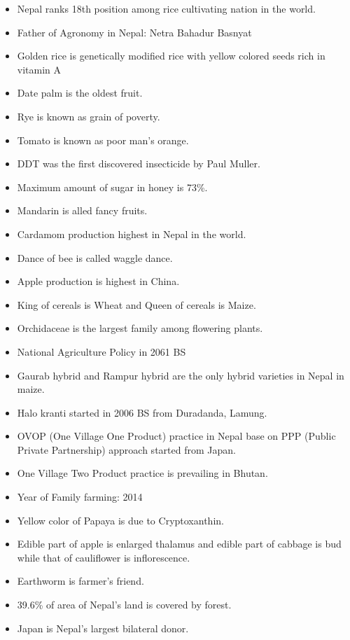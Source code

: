 \documentclass[
  openany]{book}
\providecommand{\tightlist}{%
  \setlength{\itemsep}{0pt}\setlength{\parskip}{0pt}}
\begin{document}
\begin{itemize}
\tightlist
\item
  Nepal ranks 18th position among rice cultivating nation in the world.
\item
  Father of Agronomy in Nepal: Netra Bahadur Basnyat
\item
  Golden rice is genetically modified rice with yellow colored seeds rich in vitamin A
\item
  Date palm is the oldest fruit.
\item
  Rye is known as grain of poverty.
\item
  Tomato is known as poor man's orange.
\item
  DDT was the first discovered insecticide by Paul Muller.
\item
  Maximum amount of sugar in honey is 73\%.
\item
  Mandarin is alled fancy fruits.
\item
  Cardamom production highest in Nepal in the world.
\item
  Dance of bee is called waggle dance.
\item
  Apple production is highest in China.
\item
  King of cereals is Wheat and Queen of cereals is Maize.
\item
  Orchidaceae is the largest family among flowering plants.
\item
  National Agriculture Policy in 2061 BS
\item
  Gaurab hybrid and Rampur hybrid are the only hybrid varieties in Nepal in maize.
\item
  Halo kranti started in 2006 BS from Duradanda, Lamung.
\item
  OVOP (One Village One Product) practice in Nepal base on PPP (Public Private Partnership) approach started from Japan.
\item
  One Village Two Product practice is prevailing in Bhutan.
\item
  Year of Family farming: 2014
\item
  Yellow color of Papaya is due to Cryptoxanthin.
\item
  Edible part of apple is enlarged thalamus and edible part of cabbage is bud while that of cauliflower is inflorescence.
\item
  Earthworm is farmer's friend.
\item
  39.6\% of area of Nepal's land is covered by forest.
\item
  Japan is Nepal's largest bilateral donor.

\end{itemize}
\end{document}
